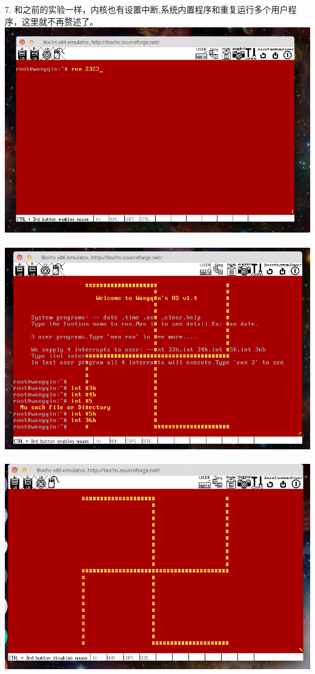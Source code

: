 \documentclass[a4paper]{article}
\begin{document}
{{7. 和之前的实验一样，内核也有设置中断,系统内置程序和重复运行多个用户程序，这里就不再赘述了。
{\center\includegraphics[scale=0.4]{Illustrations/runseq.png}}\\\\
{\center\includegraphics[scale=0.4]{Illustrations/allcustomint.png}}\\\\
{\center\includegraphics[scale=0.4]{Illustrations/usr3.png}}\\\\

}}
\end{document}
